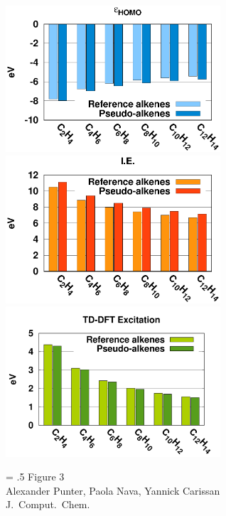 \documentclass[12pt]{article}
\begin{document}
\begin{figure}
\begin{center}
\includegraphics[width=8cm]{short_pbe0_homo_uhf}\\
\includegraphics[width=8cm]{short_pbe0_ie_uhf}\\
\includegraphics[width=8cm]{short_pbe0_tddft}
\end{center}
{\Large
\begin{minipage}[t]{3in}
\baselineskip = .5\baselineskip
Figure 3 \\
Alexander Punter, Paola Nava, Yannick Carissan\\
J.\ Comput.\ Chem.
\end{minipage}
}
\end{figure}

\clearpage
\end{document}
